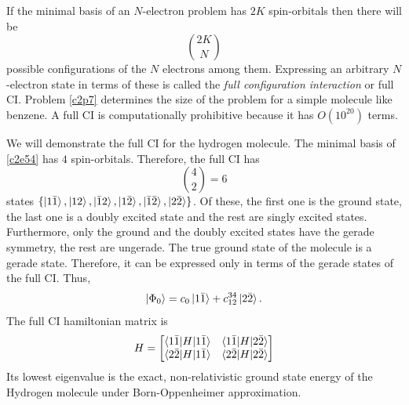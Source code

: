 If the minimal basis of an $N$-electron problem has $2K$ spin-orbitals then
there will be
\[
\binom{2K}{N}
\]
possible configurations of the $N$ electrons among them. Expressing an arbitrary
$N$-electron state in terms of these is called the \emph{full configuration
interaction} or full CI. Problem \ref{c2p7} determines the size of the problem
for a simple molecule like benzene. A full CI is computationally prohibitive
because it has $O(10^{20})$ terms.

We will demonstrate the full CI for the hydrogen molecule. The minimal basis
of \eqref{c2e54} has $4$ spin-orbitals. Therefore, the full CI has 
\[
\binom{4}{2} = 6
\]
states $\{\ket{1\bar{1}}, \ket{12}, \ket{\bar{1}2}, \ket{1\bar{2}}, 
\ket{\bar{1}\bar{2}}, \ket{2\bar{2}}\}$. Of these, the first one is the ground
state, the last one is a doubly excited state and the rest are singly excited
states. Furthermore, only the ground and the doubly excited states have the
gerade symmetry, the rest are ungerade. The true ground state of the molecule is
a gerade state. Therefore, it can be expressed only in terms of the gerade
states of the full CI. Thus,
\begin{equation}\label{c2e63}
\ket{\Phi_0} = c_0\ket{1\bar{1}} + c_{12}^{34}\ket{2\bar{2}}.
\end{equation}
The full CI hamiltonian matrix is
\begin{equation}\label{c2e64}
H = \begin{bmatrix} 
\braket{1\bar{1}|H|1\bar{1}} & \braket{1\bar{1}|H|2\bar{2}} \\
\braket{2\bar{2}|H|1\bar{1}} & \braket{2\bar{2}|H|2\bar{2}}
\end{bmatrix}
\end{equation}
Its lowest eigenvalue is the exact, non-relativistic ground state energy of the
Hydrogen molecule under Born-Oppenheimer approximation.

